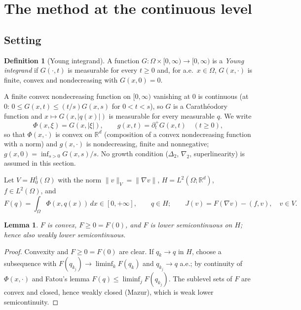 \documentclass[11pt]{amsart}
\newtheorem{lemma}[theorem]{Lemma}
\theoremstyle{definition}
\newtheorem{definition}[theorem]{Definition}
\theoremstyle{remark}
\numberwithin{equation}{section}
\newcommand{\R}{\mathbb{R}}
\newcommand{\dx}{\,dx}
\newcommand{\abs}[1]{\lvert #1\rvert}
\newcommand{\norm}[1]{\lVert #1\rVert}
\begin{document}
\section{The method at the continuous level}\label{sec:continuous}

\subsection{Setting}\label{ssec:setting}
\begin{definition}[Young integrand]\label{def:young}
A function $G\colon\Omega\times[0,\infty)\to[0,\infty)$ is a \emph{Young integrand} if $G(\cdot,t)$ is measurable for every $t\ge0$ and, for a.e.\ $x\in\Omega$, $G(x,\cdot)$ is finite, convex and nondecreasing with $G(x,0)=0$.
\end{definition}
A finite convex nondecreasing function on $[0,\infty)$ vanishing at $0$ is continuous (at $0$: $0\le G(x,t)\le (t/s)G(x,s)$ for $0<t<s$), so $G$ is a Carath\'eodory function and $x\mapsto G(x,\abs{q(x)})$ is measurable for every measurable $q$. We write
\[
\Phi(x,\xi)=G(x,\abs\xi),\qquad g(x,t)=\partial_t^+G(x,t)\quad(t\ge0),
\]
so that $\Phi(x,\cdot)$ is convex on $\R^d$ (composition of a convex nondecreasing function with a norm) and $g(x,\cdot)$ is nondecreasing, finite and nonnegative; $g(x,0)=\inf_{s>0}G(x,s)/s$. No growth condition ($\Delta_2$, $\nabla_2$, superlinearity) is assumed in this section.

Let $V=H^1_0(\Omega)$ with the norm $\norm{v}_V=\norm{\nabla v}$, $H=L^2(\Omega;\R^d)$, $f\in L^2(\Omega)$, and
\[
F(q)=\int_\Omega\Phi(x,q(x))\dx\in[0,+\infty],\qquad q\in H;\qquad J(v)=F(\nabla v)-(f,v),\quad v\in V .
\]
\begin{lemma}\label{lem:F}
$F$ is convex, $F\ge0=F(0)$, and $F$ is lower semicontinuous on $H$; hence also weakly lower semicontinuous.
\end{lemma}
\begin{proof}
Convexity and $F\ge 0=F(0)$ are clear. If $q_k\to q$ in $H$, choose a subsequence with $F(q_{k_j})\to\liminf_kF(q_k)$ and $q_{k_j}\to q$ a.e.; by continuity of $\Phi(x,\cdot)$ and Fatou's lemma $F(q)\le\liminf_jF(q_{k_j})$. The sublevel sets of $F$ are convex and closed, hence weakly closed (Mazur), which is weak lower semicontinuity.
\end{proof}
\end{document}
